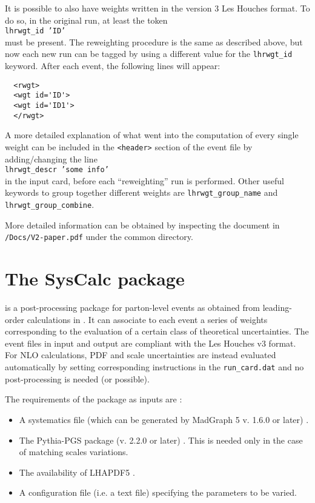 \noindent It is possible to also have weights written in the version 3 Les Houches format. 
To do so, in the original run, at least the token\\
\texttt{lhrwgt\_id 'ID'}\\
\noindent must be present. The reweighting procedure is the same as described 
above, but now each new run can be tagged by using a different value 
for the \texttt{lhrwgt\_id} keyword. After each event, the following lines will 
appear: 
\small{
\begin{verbatim}
  <rwgt> 
  <wgt id='ID'>
  <wgt id='ID1'>
  </rwgt> 
\end{verbatim}}
\normalsize

A more detailed explanation of what went into the computation of every 
single weight can be included in the \texttt{<header>} section of the event 
file by adding/changing the line \\
\texttt{lhrwgt\_descr 'some info'}\\
\noindent in the input card, before each ``reweighting'' run is performed. Other 
useful keywords to group together different weights are 
\texttt{lhrwgt\_group\_name} and \texttt{lhrwgt\_group\_combine}. 

More detailed information can be obtained by inspecting the document in 
\texttt{/Docs/V2-paper.pdf} under the common  directory. 

\section{The SysCalc package}

\syscalc is a post-processing package for parton-level events as obtained from leading-order calculations in \madgraph.  It can associate to each event a series of weights corresponding to the evaluation of a certain class of theoretical uncertainties. The event files in input and output are compliant with  the Les Houches v3 format.
For NLO calculations, PDF and scale uncertainties are instead evaluated automatically by setting corresponding instructions in the \texttt{run\_card.dat} and no post-processing is needed (or possible).

The requirements of the package as inputs are : 
\begin{itemize}
\item A systematics file (which can be generated by MadGraph 5 v. 1.6.0 or later) \cite{Alwall:1405.0301,Alwall:2011uj}.
\item The Pythia-PGS package (v. 2.2.0 or later) \cite{Sjostrand:2006za}. This is needed only in the case of matching scales variations.
\item The availability of LHAPDF5 \cite{Whalley:2005nh}.
\item A configuration file (i.e. a text file) specifying the parameters to be varied. 
\end{itemize}

